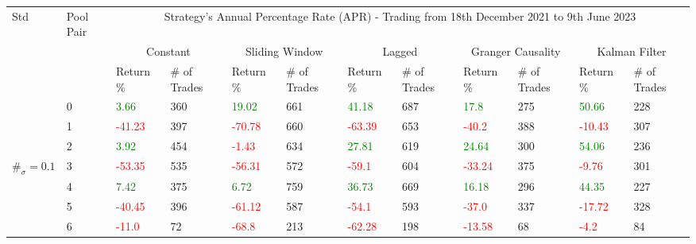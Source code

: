 \begin{table}[!htb]
    \centering
    \begin{adjustwidth}{-0.8in}{-0.9in}
        \begin{tabular}{|p{4em}|p{2em}|p{3em}|p{3em}|p{3em}|p{3em}|p{3em}|p{3em}|p{3em}|p{3em}|p{3em}|p{3em}|}\hline
            Std & Pool Pair & \multicolumn{10}{|c|}{Strategy's Annual Percentage Rate (APR) - Trading from 18th December 2021 to 9th June 2023} \\\cline{3-12}
            &   & \multicolumn{2}{|c|}{Constant} & \multicolumn{2}{|c|}{Sliding Window} & \multicolumn{2}{|c|}{Lagged} & \multicolumn{2}{|c|}{Granger Causality} & \multicolumn{2}{|c|}{Kalman Filter}\\\cline{3-12}
            & & Return \% & \# of Trades & Return \% & \# of Trades & Return \% & \# of Trades & Return \% & \# of Trades & Return \% & \# of Trades\\\hline

            & 0 & \textcolor{green}{3.66} & 360 & \textcolor{green}{19.02} & 661 & \textcolor{green}{41.18} & 687 & \textcolor{green}{17.8} & 275 & \textcolor{green}{50.66} & 228\\\cline{3-12}
            & 1 & \textcolor{red}{-41.23} & 397 & \textcolor{red}{-70.78} & 660 & \textcolor{red}{-63.39} & 653 & \textcolor{red}{-40.2} & 388 & \textcolor{red}{-10.43} & 307\\\cline{3-12}
            & 2 & \textcolor{green}{3.92} & 454 & \textcolor{red}{-1.43} & 634 & \textcolor{green}{27.81} & 619 & \textcolor{green}{24.64} & 300 & \textcolor{green}{54.06} & 236\\\cline{3-12}
            $\#_{\sigma}=0.1$ & 3 & \textcolor{red}{-53.35} & 535 & \textcolor{red}{-56.31} & 572 & \textcolor{red}{-59.1} & 604 & \textcolor{red}{-33.24} & 375 & \textcolor{red}{-9.76} & 301\\\cline{3-12}
            & 4 & \textcolor{green}{7.42} & 375 & \textcolor{green}{6.72} & 759 & \textcolor{green}{36.73} & 669 & \textcolor{green}{16.18} & 296 & \textcolor{green}{44.35} & 227\\\cline{3-12}
            & 5 & \textcolor{red}{-40.45} & 396 & \textcolor{red}{-61.12} & 587 & \textcolor{red}{-54.1} & 593 & \textcolor{red}{-37.0} & 337 & \textcolor{red}{-17.72} & 328\\\cline{3-12}
            & 6 & \textcolor{red}{-11.0} & 72 & \textcolor{red}{-68.8} & 213 & \textcolor{red}{-62.28} & 198 & \textcolor{red}{-13.58} & 68 & \textcolor{red}{-4.2} & 84\\\hline\hline


\end{tabular}
\end{adjustwidth}
\end{table}
